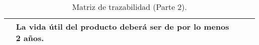 \begin{table}[H]
\begin{tabular}{|l|l|l|l|}
                                                       & La vida útil del producto deberá ser de por lo menos 2 años.                                                                                                                                                         &                                                       &                                                                                                            \\ \hline
\end{tabular}
\caption{Matriz de trazabilidad (Parte 2).}
\end{table}